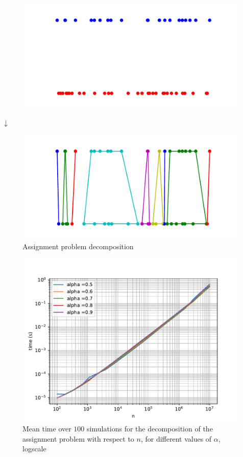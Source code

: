 \documentclass[a4paper,12pt]{article}
\begin{document}
\begin{figure}[H]
\includegraphics[width = \columnwidth]{before_decomp.pdf}
\end{figure}
\begin{center}
$\downarrow$
\end{center}
\begin{figure}[H]
\includegraphics[width = \columnwidth]{decomp_fig.pdf}
\caption{Assignment problem decomposition}\label{decomp_fig}
\end{figure}

\begin{figure}[H]
\includegraphics[width = \columnwidth]{decomp_time.pdf}
\caption{Mean time over $100$ simulations for the decomposition of the assignment problem with respect to $n$, for different values of $\alpha$, logscale}\label{decomp_time}
\end{figure}
\end{document}
